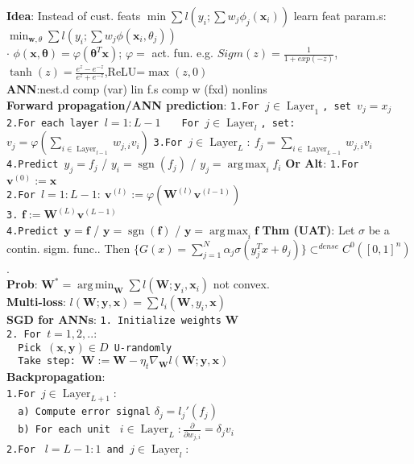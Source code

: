 \documentclass[11pt]{article}
\newcommand{\bv}[1]{\mathbf{#1}}
\DeclareMathOperator*{\argmax}{arg\,max}
\DeclareMathOperator*{\argmin}{arg\,min}
\DeclareMathOperator*{\sgn}{sgn}
\DeclareMathOperator*{\Layer}{Layer}
\begin{document}
\begin{multicols}{4}
\textbf{Idea}: Instead of cust. feats $\min\sum l(y_i;\sum w_j\phi_j(\bv{x}_i))$
learn feat param.s: $\min_{\bv{w},\theta}\sum l(y_i;\sum w_j\phi(\bv{x}_i,\theta_j))$\\
$\cdot$ $\phi(\bv{x},\bv{\theta})=\varphi(\bv{\theta}^T\bv{x})$; $\varphi=$ act. fun. e.g. $Sigm(z)=\frac{1}{1+exp(-z)}$,$\tanh(z)=\frac{e^z-e^{-z}}{e^z+e^{-z}}$,ReLU=$\max(z,0)$\\
\textbf{ANN}:nest.d comp (var) lin f.s comp w (fxd) nonlins\\
\textbf{Forward propagation/ANN prediction}:
\verb|1.For |$j\in \Layer_1$\verb|, set |$v_j=x_j$\\
\verb|2.For each layer |$l=1:L-1$
\verb|   For |$j\in \Layer_l$\verb|, set:|$v_j=\varphi(\sum_{i\in\Layer_{l-1}}w_{j,i}v_i)$
\verb|3.For |$j\in\Layer_L:\ f_j=\sum_{i\in\Layer_{L-1}}w_{j,i}v_i$\\
\verb|4.Predict |$y_j=f_j$ / $y_i=\sgn(f_j)$ / $y_j=\argmax_i f_i$
\textbf{Or Alt}:
\verb|1.For |$\bv{v}^{(0)}:=\bv{x}$\\
\verb|2.For |$l=1:L-1:\ \bv{v}^{(l)}:=\varphi(\bv{W}^{(l)}\bv{v}^{(l-1)})$\\
\verb|3.| $\bv{f}:=\bv{W}^{(L)}\bv{v}^{(L-1)}$\\
\verb|4.Predict |$\bv{y}=\bv{f}$ / $\bv{y}=\sgn(\bv{f})$ / $\bv{y}=\argmax_i \bv{f}$
\textbf{Thm (UAT)}: Let $\sigma$ be a contin. sigm. func.. Then $\{G(x)=\sum^N_{j=1}\alpha_j\sigma(y_j^T x+\theta_j)\}\subset^{dense}C^0([0,1]^n)$.\\
\textbf{Prob}: $\bv{W}^*=\argmin_\bv{W}\sum l(\bv{W};\bv{y}_i,\bv{x}_i)$ not convex.\\
\textbf{Multi-loss}: $l(\bv{W};\bv{y},\bv{x})=\sum l_i(\bv{W},y_i,\bv{x})$\\
\textbf{SGD for ANNs}: \verb|1. Initialize weights| $\bv{W}$\\
\verb|2. For |$t=1,2,..:$\\	
\verb|  Pick |$(\bv{x},\bv{y})\in D$\verb| U-randomly|\\
\verb|  Take step: |$\bv{W}:=\bv{W}-\eta_t\nabla_\bv{W}l(\bv{W};\bv{y},\bv{x})$\\
\textbf{Backpropagation}:\\
\verb|1.For |$j\in\Layer_{L+1}$:\\
\verb|  a) Compute error signal| $\delta_j=l_j' (f_j)$\\
\verb|  b) For each unit | $i\in \Layer_L: \frac{\partial}{\partial w_{j,i}}=\delta_jv_i$\\
\verb|2.For | $l=L-1:1$\verb| and |$j\in\Layer_l:$\\

\end{multicols}
\end{document}
